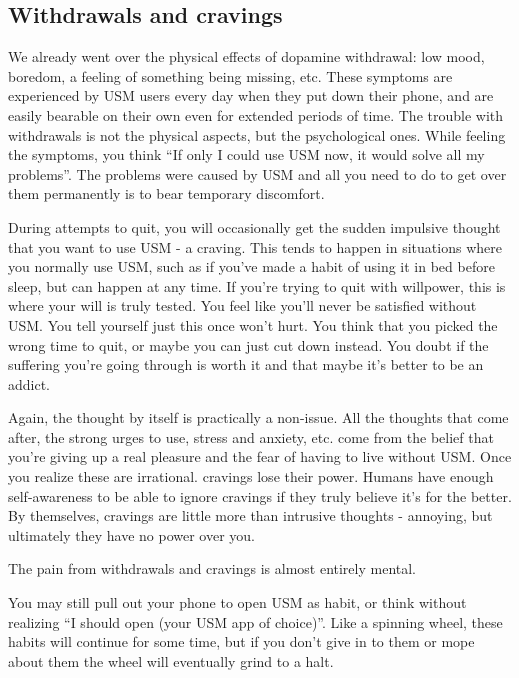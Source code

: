 \documentclass[
  openany]{book}
\newenvironment{rmdnote}{
\color{blue}
\begin{framed}}{\end{framed}}
\begin{document}
\subsection{Withdrawals and cravings}\label{withdrawals-and-cravings}

We already went over the physical effects of dopamine withdrawal: low mood, boredom, a feeling of something being missing, etc. These symptoms are experienced by USM users every day when they put down their phone, and are easily bearable on their own even for extended periods of time. The trouble with withdrawals is not the physical aspects, but the psychological ones. While feeling the symptoms, you think ``If only I could use USM now, it would solve all my problems''. The problems were caused by USM and all you need to do to get over them permanently is to bear temporary discomfort.

During attempts to quit, you will occasionally get the sudden impulsive thought that you want to use USM - a craving. This tends to happen in situations where you normally use USM, such as if you've made a habit of using it in bed before sleep, but can happen at any time. If you're trying to quit with willpower, this is where your will is truly tested. You feel like you'll never be satisfied without USM. You tell yourself just this once won't hurt. You think that you picked the wrong time to quit, or maybe you can just cut down instead. You doubt if the suffering you're going through is worth it and that maybe it's better to be an addict.

Again, the thought by itself is practically a non-issue. All the thoughts that come after, the strong urges to use, stress and anxiety, etc. come from the belief that you're giving up a real pleasure and the fear of having to live without USM. Once you realize these are irrational. cravings lose their power. Humans have enough self-awareness to be able to ignore cravings if they truly believe it's for the better. By themselves, cravings are little more than intrusive thoughts - annoying, but ultimately they have no power over you.

\begin{rmdnote}
The pain from withdrawals and cravings is almost entirely mental.

\end{rmdnote}

You may still pull out your phone to open USM as habit, or think without realizing ``I should open (your USM app of choice)''. Like a spinning wheel, these habits will continue for some time, but if you don't give in to them or mope about them the wheel will eventually grind to a halt.
\end{document}
